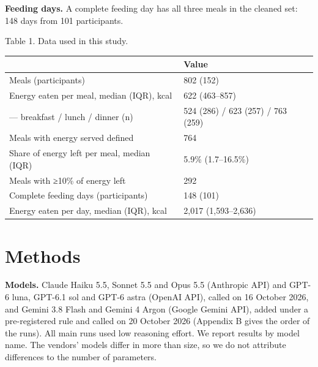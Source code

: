 \documentclass[
  11pt,
  letterpaper]{article}
\newcounter{none} %
\begin{document}
\textbf{Feeding days.} A complete feeding day has all three meals in the cleaned set: 148 days from 101
participants.

Table 1. Data used in this study.

{\def\LTcaptype{none} %
\begin{longtable}[]{@{}ll@{}}
\toprule\noalign{}
& Value \\
\midrule\noalign{}
\endhead
\bottomrule\noalign{}
\endlastfoot
Meals (participants) & 802 (152) \\
Energy eaten per meal, median (IQR), kcal & 622 (463--857) \\
--- breakfast / lunch / dinner (n) & 524 (286) / 623 (257) / 763 (259) \\
Meals with energy served defined & 764 \\
Share of energy left per meal, median (IQR) & 5.9\% (1.7--16.5\%) \\
Meals with ≥10\% of energy left & 292 \\
Complete feeding days (participants) & 148 (101) \\
Energy eaten per day, median (IQR), kcal & 2,017 (1,593--2,636) \\
\end{longtable}
}

\section{Methods}\label{methods}

\textbf{Models.} Claude Haiku 5.5, Sonnet 5.5 and Opus 5.5 (Anthropic API) and GPT-6 luna, GPT-6.1 sol and
GPT-6 astra (OpenAI API), called on 16 October 2026, and Gemini 3.8 Flash and Gemini 4 Argon (Google Gemini
API), added under a pre-registered rule and called on 20 October 2026 (Appendix B gives the order of the
runs). All main runs used low reasoning effort. We report results by model name. The vendors' models differ in
more than size, so we do not attribute differences to the number of parameters.
\end{document}
